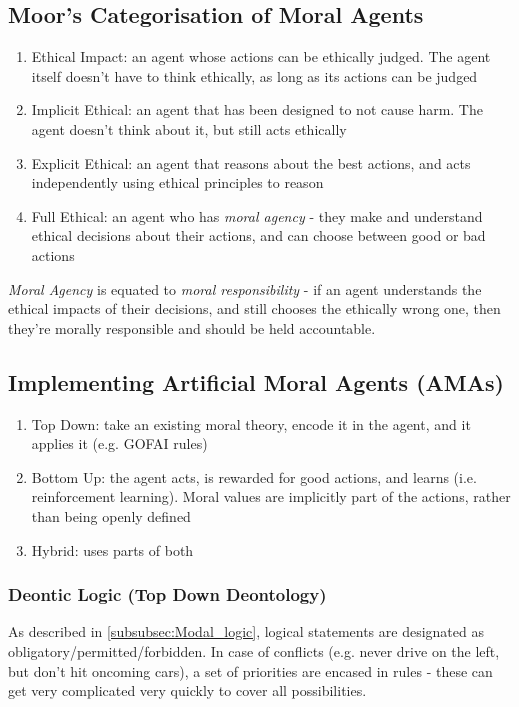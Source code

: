 \subsection{Moor's Categorisation of Moral Agents}\label{subsec:Moral_Agent_Categories}
\begin{enumerate}
    \item Ethical Impact: an agent whose actions can be ethically judged. The agent itself doesn't have to think ethically, as long as its actions can be judged
    \item Implicit Ethical: an agent that has been designed to not cause harm. The agent doesn't think about it, but still acts ethically
    \item Explicit Ethical: an agent that reasons about the best actions, and acts independently using ethical principles to reason
    \item Full Ethical: an agent who has \emph{moral agency} -  they make and understand ethical decisions about their actions, and can choose between good or bad actions
\end{enumerate}
\emph{Moral Agency} is equated to \emph{moral responsibility} - if an agent understands the ethical impacts of their decisions, and still chooses the ethically wrong one, then they're morally responsible and should be held accountable.

\subsection{Implementing Artificial Moral Agents (AMAs)}\label{subsec:implementing_moral_agents}
\begin{enumerate}
    \item Top Down: take an existing  moral theory, encode it in the agent, and it applies it (e.g. GOFAI rules)
    \item Bottom Up: the agent acts, is rewarded for good actions, and learns (i.e. reinforcement learning). Moral values are implicitly part of the actions, rather than being openly defined
    \item Hybrid: uses parts of both
\end{enumerate}

\subsubsection{Deontic Logic (Top Down Deontology)}
As described in \ref{subsubsec:Modal_logic}, logical statements are designated as obligatory/permitted/forbidden. In case of conflicts (e.g. never drive on the left, but don't hit oncoming cars), a set of priorities are encased in rules - these can get very complicated very quickly to cover all possibilities.\\


